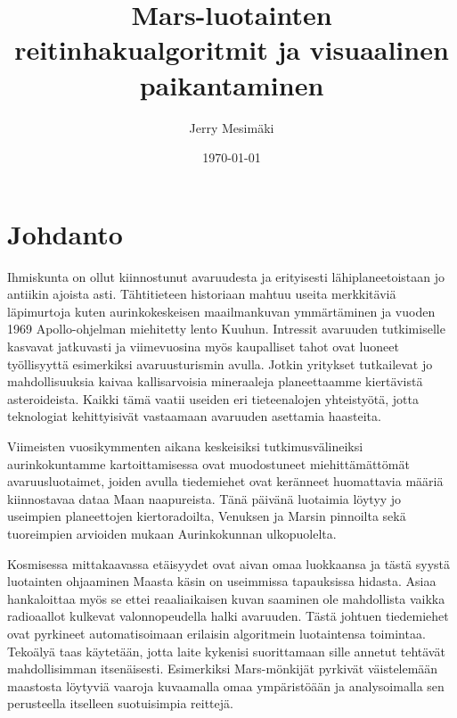 \documentclass[finnish]{tktltiki2}
\title{Mars-luotainten reitinhakualgoritmit ja visuaalinen paikantaminen}
\author{Jerry Mesimäki}
\date{\today}
\theoremstyle{definition}
\theoremstyle{remark}
\begin{document}

\frontmatter      %

\maketitle        %
\makeabstract     %

\tableofcontents  %


\mainmatter       %

\section{Johdanto}

Ihmiskunta on ollut kiinnostunut avaruudesta ja erityisesti lähiplaneetoistaan jo antiikin ajoista asti. Tähtitieteen historiaan mahtuu useita merkkitäviä läpimurtoja kuten aurinkokeskeisen maailmankuvan ymmärtäminen ja vuoden 1969 Apollo-ohjelman miehitetty lento Kuuhun. Intressit avaruuden tutkimiselle kasvavat jatkuvasti ja viimevuosina myös kaupalliset tahot ovat luoneet työllisyyttä esimerkiksi avaruusturismin avulla. Jotkin yritykset tutkailevat jo mahdollisuuksia kaivaa kallisarvoisia mineraaleja planeettaamme kiertävistä asteroideista. Kaikki tämä vaatii useiden eri tieteenalojen yhteistyötä, jotta teknologiat kehittyisivät vastaamaan avaruuden asettamia haasteita.

Viimeisten vuosikymmenten aikana keskeisiksi tutkimusvälineiksi aurinkokuntamme kartoittamisessa ovat muodostuneet miehittämättömät avaruusluotaimet, joiden avulla tiedemiehet ovat keränneet huomattavia määriä kiinnostavaa dataa Maan naapureista. Tänä päivänä luotaimia löytyy jo useimpien planeettojen kiertoradoilta, Venuksen ja Marsin pinnoilta sekä tuoreimpien arvioiden mukaan Aurinkokunnan ulkopuolelta.

Kosmisessa mittakaavassa etäisyydet ovat aivan omaa luokkaansa ja tästä syystä luotainten ohjaaminen Maasta käsin on useimmissa tapauksissa hidasta. Asiaa hankaloittaa myös se ettei reaaliaikaisen kuvan saaminen ole mahdollista vaikka radioaallot kulkevat valonnopeudella halki avaruuden. Tästä johtuen tiedemiehet ovat pyrkineet automatisoimaan erilaisin algoritmein luotaintensa toimintaa. Tekoälyä taas käytetään, jotta laite kykenisi suorittamaan sille annetut tehtävät mahdollisimman itsenäisesti. Esimerkiksi Mars-mönkijät pyrkivät väistelemään maastosta löytyviä vaaroja kuvaamalla omaa ympäristöään ja analysoimalla sen perusteella itselleen suotuisimpia reittejä.
\end{document}
